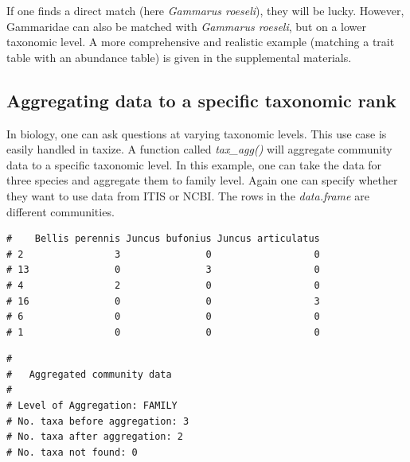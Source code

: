 \begin{sloppypar}
If one finds a direct match (here \emph{Gammarus roeseli}), they will be lucky. 
However, Gammaridae can also be matched with \emph{Gammarus roeseli}, but on a lower taxonomic level. 
A more comprehensive and realistic example (matching a trait table with an abundance table) is given in the supplemental materials.


\subsection{Aggregating data to a specific taxonomic rank}
In biology, one can ask questions at varying taxonomic levels. 
This use case is easily handled in taxize. 
A function called \emph{tax\_agg()} will aggregate community data to a specific taxonomic level. 
In this example, one can take the data for three species and aggregate them to family level. 
Again one can specify whether they want to use data from ITIS or NCBI. 
The rows in the \emph{data.frame} are different communities.

\begin{knitrout}
\color{fgcolor}\begin{kframe}
\begin{alltt}
  \hlstd{=} \hlstd{)}
 \hlkwb{<-} \hlstd{dune[ ,} \hlstd{(}\hlstd{,}\hlopt{:}\hlstd{)]}
 \hlkwb{<-} \hlstd{(}\hlstd{,} \hlstd{,}
                  \hlstd{)}
\end{alltt}
\begin{verbatim}
#    Bellis perennis Juncus bufonius Juncus articulatus
# 2                3               0                  0
# 13               0               3                  0
# 4                2               0                  0
# 16               0               0                  3
# 6                0               0                  0
# 1                0               0                  0
\end{verbatim}
\end{kframe}
\end{knitrout}


\begin{knitrout}
\color{fgcolor}\begin{kframe}
\begin{alltt}
 \hlkwb{<-}   \hlstd{=} \hlstd{,}  \hlstd{=} \hlstd{)}
\end{alltt}
\begin{verbatim}
# 
# 	Aggregated community data
# 
# Level of Aggregation: FAMILY
# No. taxa before aggregation: 3
# No. taxa after aggregation: 2
# No. taxa not found: 0
\end{verbatim}
\end{kframe}
\end{knitrout}



\end{sloppypar}
